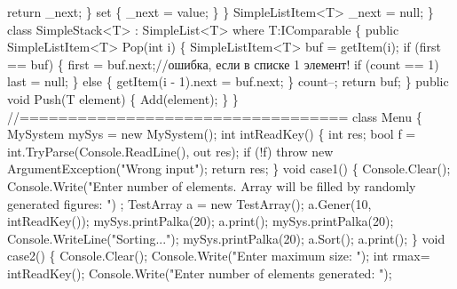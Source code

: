 \begin{DoxyCode}
                \textcolor{keywordflow}{return} \_next;
            \}
            \textcolor{keyword}{set}
            \{
                \_next = value;
            \}
        \}
        SimpleListItem<T> \_next = null;
    \}
    \textcolor{keyword}{class }SimpleStack<T> : SimpleList<T>
        where T:IComparable
    \{
        \textcolor{keyword}{public} SimpleListItem<T> Pop(\textcolor{keywordtype}{int} i)
        \{
            SimpleListItem<T> buf = getItem(i);
            \textcolor{keywordflow}{if} (first == buf)
            \{
                first = buf.next;\textcolor{comment}{//ошибка, если в списке 1 элемент!}
                \textcolor{keywordflow}{if} (count == 1)
                    last = null;
            \}
            \textcolor{keywordflow}{else}
            \{
                getItem(i - 1).next = buf.next;
            \}
            count--;
            \textcolor{keywordflow}{return} buf;
        \}
        \textcolor{keyword}{public} \textcolor{keywordtype}{void} Push(T element)
        \{
            Add(element);
        \}
    \}
    \textcolor{comment}{//==================================}
    \textcolor{keyword}{class }Menu
    \{
        MySystem mySys = \textcolor{keyword}{new} MySystem();
        \textcolor{keywordtype}{int} intReadKey()
        \{
            \textcolor{keywordtype}{int} res;
            \textcolor{keywordtype}{bool} f = \textcolor{keywordtype}{int}.TryParse(Console.ReadLine(), out res);
            \textcolor{keywordflow}{if} (!f)
                \textcolor{keywordflow}{throw} \textcolor{keyword}{new} ArgumentException(\textcolor{stringliteral}{"Wrong input"});
            \textcolor{keywordflow}{return} res;
        \}
        \textcolor{keywordtype}{void} case1()
        \{
            Console.Clear();
            Console.Write(\textcolor{stringliteral}{"Enter number of elements. Array will be filled by randomly generated figures: "})
      ;
            TestArray a = \textcolor{keyword}{new} TestArray();
            a.Gener(10, intReadKey());
            mySys.printPalka(20);
            a.print();
            mySys.printPalka(20);
            Console.WriteLine(\textcolor{stringliteral}{"Sorting..."});
            mySys.printPalka(20);
            a.Sort();
            a.print();
        \}
        \textcolor{keywordtype}{void} case2()
        \{
            Console.Clear();
            Console.Write(\textcolor{stringliteral}{"Enter maximum size: "});
            \textcolor{keywordtype}{int} rmax= intReadKey();
            Console.Write(\textcolor{stringliteral}{"Enter number of elements generated: "});

\end{DoxyCode}
